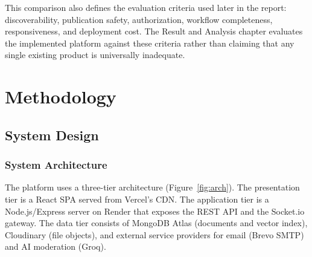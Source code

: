 \documentclass[12pt,a4paper]{report}
\begin{document}
This comparison also defines the evaluation criteria used later in
the report: discoverability, publication safety, authorization,
workflow completeness, responsiveness, and deployment cost. The
Result and Analysis chapter evaluates the implemented platform
against these criteria rather than claiming that any single existing
product is universally inadequate.

\chapter{Methodology}
\section{System Design}
\subsection{System Architecture}
The platform uses a three-tier architecture
(Figure~\ref{fig:arch}). The presentation tier is a React SPA served
from Vercel's CDN. The application tier is a Node.js/Express server
on Render that exposes the REST API and the Socket.io gateway. The
data tier consists of MongoDB Atlas (documents and vector index),
Cloudinary (file objects), and external service providers for email
(Brevo SMTP) and AI moderation (Groq).
\end{document}
